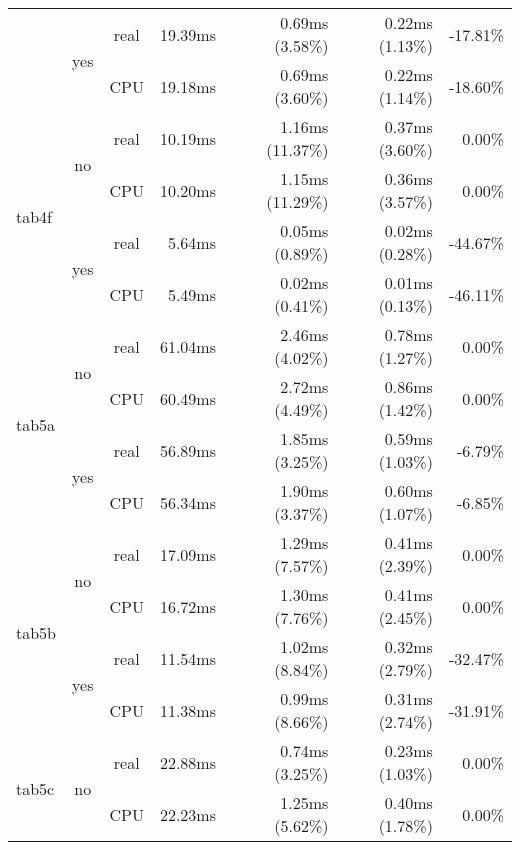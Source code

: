 \documentclass[en]{pracamgr}
\begin{document}
\begin{appendices}
\begin{small}
\begin{longtable}{|l|c|c|r|r|r|r|}
                          \cline{2-7}
                          & \multirow{2}{*}{yes} & real & 19.39ms & 0.69ms (3.58\%) & 0.22ms (1.13\%) & -17.81\% \\*
                          &                      & CPU  & 19.18ms & 0.69ms (3.60\%) & 0.22ms (1.14\%) & -18.60\% \\
\hline
\multirow{4}{*}{tab4f}    & \multirow{2}{*}{no}  & real & 10.19ms & 1.16ms (11.37\%) & 0.37ms (3.60\%) & 0.00\% \\*
                          &                      & CPU  & 10.20ms & 1.15ms (11.29\%) & 0.36ms (3.57\%) & 0.00\% \\*
                          \cline{2-7}
                          & \multirow{2}{*}{yes} & real & 5.64ms & 0.05ms (0.89\%) & 0.02ms (0.28\%) & -44.67\% \\*
                          &                      & CPU  & 5.49ms & 0.02ms (0.41\%) & 0.01ms (0.13\%) & -46.11\% \\
\hline
\multirow{4}{*}{tab5a}    & \multirow{2}{*}{no}  & real & 61.04ms & 2.46ms (4.02\%) & 0.78ms (1.27\%) & 0.00\% \\*
                          &                      & CPU  & 60.49ms & 2.72ms (4.49\%) & 0.86ms (1.42\%) & 0.00\% \\*
                          \cline{2-7}
                          & \multirow{2}{*}{yes} & real & 56.89ms & 1.85ms (3.25\%) & 0.59ms (1.03\%) & -6.79\% \\*
                          &                      & CPU  & 56.34ms & 1.90ms (3.37\%) & 0.60ms (1.07\%) & -6.85\% \\
\hline
\multirow{4}{*}{tab5b}    & \multirow{2}{*}{no}  & real & 17.09ms & 1.29ms (7.57\%) & 0.41ms (2.39\%) & 0.00\% \\*
                          &                      & CPU  & 16.72ms & 1.30ms (7.76\%) & 0.41ms (2.45\%) & 0.00\% \\*
                          \cline{2-7}
                          & \multirow{2}{*}{yes} & real & 11.54ms & 1.02ms (8.84\%) & 0.32ms (2.79\%) & -32.47\% \\*
                          &                      & CPU  & 11.38ms & 0.99ms (8.66\%) & 0.31ms (2.74\%) & -31.91\% \\
\hline
\multirow{4}{*}{tab5c}    & \multirow{2}{*}{no}  & real & 22.88ms & 0.74ms (3.25\%) & 0.23ms (1.03\%) & 0.00\% \\*
                          &                      & CPU  & 22.23ms & 1.25ms (5.62\%) & 0.40ms (1.78\%) & 0.00\% \\*

\end{longtable}
\end{small}
\end{appendices}
\end{document}
